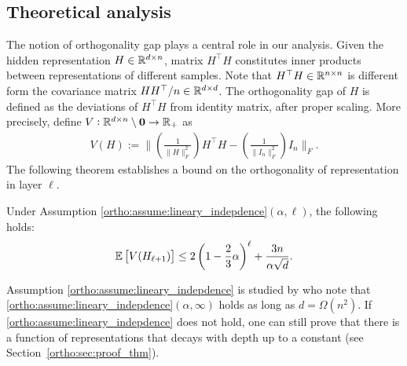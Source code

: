 \subsection{Theoretical analysis}
The notion of orthogonality gap plays a central role in our analysis. Given the hidden representation $H \in \mathbb{R}^{d\times n}$, matrix $H^\top H$ constitutes inner products between representations of different samples. Note that $H^\top H \in \mathbb{R}^{n \times n}$ is different form the covariance matrix $H H^\top/n \in \mathbb{R}^{d\times d}$. The orthogonality gap of $H$ is defined as the deviations of $H^\top H$ from identity matrix, after proper scaling. More precisely, define $V: \mathbb{R}^{d\times n}\setminus\mathbf{0} \to \mathbb{R}_+$ as 
\begin{align}
    V(H) := \Big\| \left(\frac{1}{\|H\|_F^2}\right)H^\top H - \left(\frac{1}{\|I_n\|_F^2}\right)I_n \Big\|_F.
\end{align}
The following theorem establishes a bound on the orthogonality of representation in layer $\ell$.
\begin{theorem} \label{ortho:thm:contraction}
Under Assumption \ref{ortho:assume:lineary_indepdence}$(\alpha,\ell)$, the following holds:
    \begin{align}\label{ortho:eq:exponential_contraction}
        \mathbb{E} \left[ V(H_{\ell+1}) \right] \leq 2 \left(1-\frac{2}{3}\alpha\right)^{\ell}+ \frac{3 n}{\alpha\sqrt{d}}.
    \end{align}
\end{theorem}
\noindent Assumption \ref{ortho:assume:lineary_indepdence} is studied by   \cite{daneshmand2020batch} who note that \ref{ortho:assume:lineary_indepdence}$(\alpha,\infty)$ holds as long as $d=\Omega(n^2)$. If \ref{ortho:assume:lineary_indepdence} does not hold, one can still prove that there is a function of representations that decays with depth up to a constant (see Section~\ref{ortho:sec:proof_thm}).


